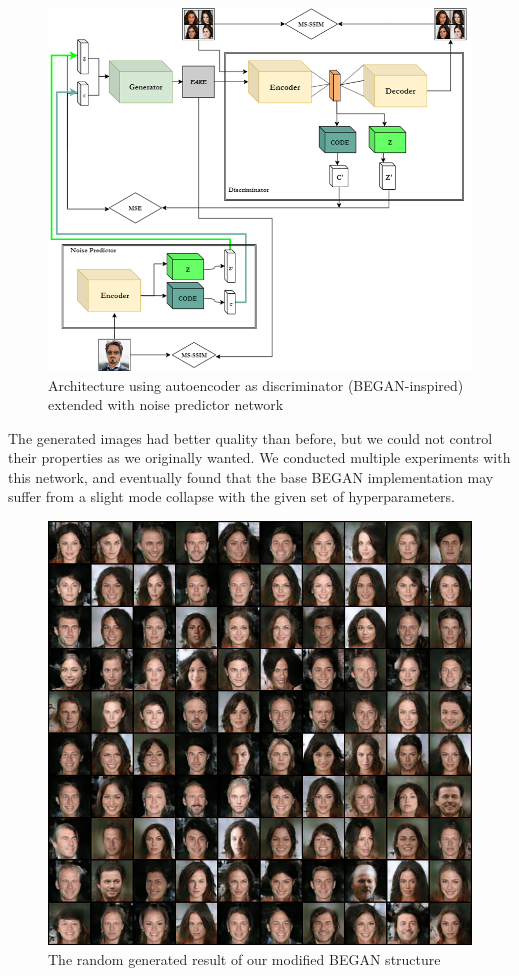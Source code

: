 \documentclass{egpubl}
\begin{document}
\begin{figure}[!htb]
	\centering
	\includegraphics[width=\linewidth]{pic/BInfoGAN+predictor}
	\caption{Architecture using autoencoder as discriminator (BEGAN-inspired) extended with noise predictor network}
	\label{fig:infogan_ae_noise}
\end{figure}

The generated images had better quality than before, but we could not control their properties as we originally wanted. We conducted multiple experiments with this network, and eventually found that the base BEGAN implementation may suffer from a slight mode collapse with the given set of hyperparameters.

\begin{figure}[!htb]
	\centering
	\includegraphics[width=\linewidth]{pic/InfoBegan_random_result}
	\caption{The random generated result of our modified BEGAN structure}
	
\end{figure}
\end{document}
